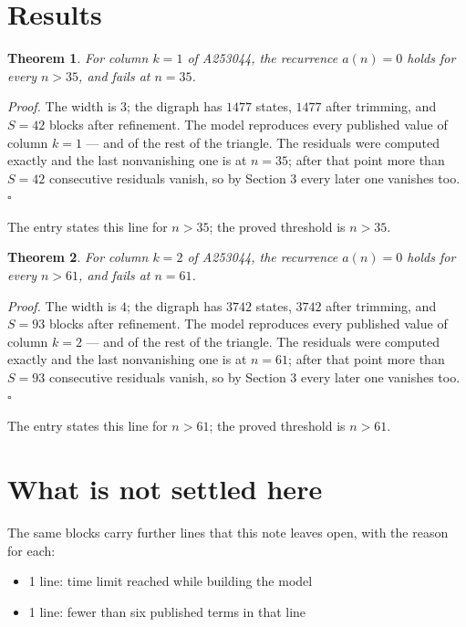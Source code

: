 \documentclass[11pt]{article}
\newtheorem{theorem}{Theorem}
\theoremstyle{definition}
\begin{document}
\section{Results}

\begin{theorem} For column $k = 1$ of A253044, the recurrence $a(n) = 0$ holds for every $n > 35$, and fails at $n = 35$.\end{theorem}

{\itshape Proof.} The width is $3$; the digraph has $1477$ states, $1477$ after trimming, and $S = 42$ blocks after refinement. The model reproduces every published value of column $k = 1$ --- and of the rest of the triangle. The residuals were computed exactly and the last nonvanishing one is at $n = 35$; after that point more than $S = 42$ consecutive residuals vanish, so by Section 3 every later one vanishes too. $\square$

The entry states this line for $n > 35$; the proved threshold is $n > 35$.

\begin{theorem} For column $k = 2$ of A253044, the recurrence $a(n) = 0$ holds for every $n > 61$, and fails at $n = 61$.\end{theorem}

{\itshape Proof.} The width is $4$; the digraph has $3742$ states, $3742$ after trimming, and $S = 93$ blocks after refinement. The model reproduces every published value of column $k = 2$ --- and of the rest of the triangle. The residuals were computed exactly and the last nonvanishing one is at $n = 61$; after that point more than $S = 93$ consecutive residuals vanish, so by Section 3 every later one vanishes too. $\square$

The entry states this line for $n > 61$; the proved threshold is $n > 61$.

\section{What is not settled here}

The same blocks carry further lines that this note leaves open, with the reason for each:

\begin{itemize}

\item 1 line: time limit reached while building the model

\item 1 line: fewer than six published terms in that line

\end{itemize}
\end{document}
